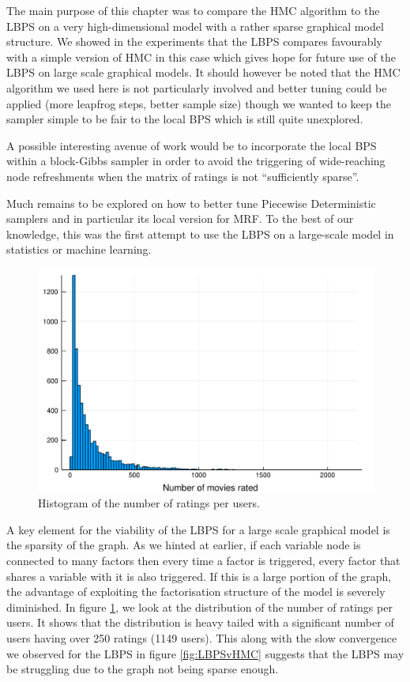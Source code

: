 The main purpose of this chapter was to compare the HMC algorithm to the LBPS on a very high-dimensional model with a rather sparse graphical model structure. We showed in the experiments that the LBPS compares favourably with a simple version of HMC in this case which gives hope for future use of the LBPS on large scale graphical models.
It should however be noted that the HMC algorithm we used here is not particularly involved and better tuning could be applied (more leapfrog steps, better sample size) though we wanted to keep the sampler simple to be fair to the local BPS which is still quite unexplored.

A possible interesting avenue of work would be to incorporate the local BPS within a block-Gibbs sampler in order to avoid the triggering of wide-reaching node refreshments when the matrix of ratings is not ``sufficiently sparse''. 

Much remains to be explored on how to better tune Piecewise Deterministic samplers and in particular its local version for MRF. To the best of our knowledge, this was the first attempt to use the LBPS on a large-scale model in statistics or machine learning. 

\begin{figure}[!h]
\center
	\includegraphics[width=.7\textwidth]{figures/lbp/hist}
	\caption{\label{fig:nratings}Histogram of the number of ratings per users.}
\end{figure}

A key element for the viability of the LBPS for a large scale graphical model is the sparsity of the graph. As we hinted at earlier, if each variable node is connected to many factors then every time a factor is triggered, every factor that shares a variable with it is also triggered. If this is a large portion of the graph, the advantage of exploiting the factorisation structure of the model is severely diminished. 
In figure \ref{fig:nratings}, we look at the distribution of the number of ratings per users. It shows that the distribution is heavy tailed with a significant number of users having over 250 ratings (1149 users). This along with the slow convergence we observed for the LBPS in figure \ref{fig:LBPSvHMC} suggests that the LBPS may be struggling due to the graph not being sparse enough.

